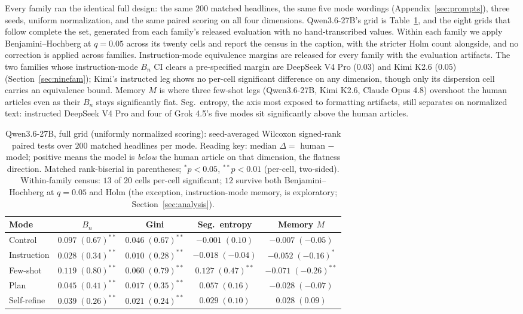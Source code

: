 \documentclass{article}
\begin{document}
Every family ran the identical full design: the same $200$ matched headlines, the same five
mode wordings (Appendix~\ref{sec:prompts}), three seeds, uniform normalization, and the same
paired scoring on all four dimensions. Qwen3.6-27B's grid is Table~\ref{tab:promptceiling}, and the eight
grids that follow complete the set,
generated from each family's released evaluation with no hand-transcribed values. Within each
family we apply Benjamini--Hochberg at $q=0.05$ across its twenty cells and report the census in
the caption, with the stricter Holm count alongside, and no correction is applied across
families. Instruction-mode equivalence margins are released for every family with the evaluation
artifacts. The two families whose instruction-mode $B_n$ CI clears a pre-specified margin are
DeepSeek V4 Pro ($0.03$) and Kimi K2.6 ($0.05$) (Section~\ref{sec:ninefam}); Kimi's instructed
leg shows no per-cell significant difference on any dimension, though only its dispersion cell
carries an equivalence bound.
Memory $M$ is where three few-shot legs (Qwen3.6-27B, Kimi K2.6, Claude Opus 4.8)
overshoot the human articles even as their $B_n$ stays significantly flat. Seg.\ entropy, the
axis most exposed to formatting artifacts, still separates on normalized text: instructed
DeepSeek V4 Pro and four of Grok 4.5's five modes sit significantly above the human articles.

\begin{table}[t]
\centering
\caption{Qwen3.6-27B, full grid (uniformly normalized scoring):
seed-averaged Wilcoxon signed-rank paired tests over $200$ matched
headlines per mode. Reading key: median $\Delta =$ human $-$ model; positive means the model is
\emph{below} the
human article on that dimension, the flatness direction. Matched rank-biserial in parentheses;
$^{*}p<0.05$, $^{**}p<0.01$ (per-cell, two-sided). Within-family census: $13$ of $20$ cells
per-cell significant; $12$ survive both Benjamini--Hochberg at $q=0.05$ and Holm (the exception,
instruction-mode memory, is exploratory; Section~\ref{sec:analysis}).}
\label{tab:promptceiling}
\begin{tabular}{lcccc}
\toprule
Mode & $B_n$ & Gini & Seg.\ entropy & Memory $M$ \\
\midrule
Control & $0.097\;(0.67)^{**}$ & $0.046\;(0.67)^{**}$ & $-0.001\;(0.10)$ & $-0.007\;(-0.05)$ \\
Instruction & $0.028\;(0.34)^{**}$ & $0.010\;(0.28)^{**}$ & $-0.018\;(-0.04)$ & $-0.052\;(-0.16)^{*}$ \\
Few-shot & $0.119\;(0.80)^{**}$ & $0.060\;(0.79)^{**}$ & $0.127\;(0.47)^{**}$ & $-0.071\;(-0.26)^{**}$ \\
Plan & $0.045\;(0.41)^{**}$ & $0.017\;(0.35)^{**}$ & $0.057\;(0.16)$ & $-0.028\;(-0.07)$ \\
Self-refine & $0.039\;(0.26)^{**}$ & $0.021\;(0.24)^{**}$ & $0.029\;(0.10)$ & $0.028\;(0.09)$ \\
\bottomrule
\end{tabular}
\end{table}
\end{document}
